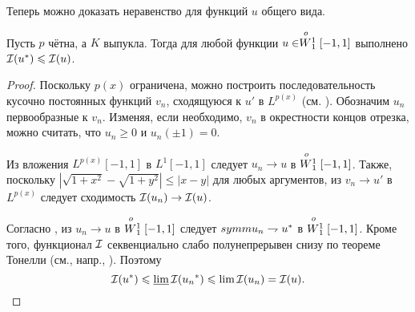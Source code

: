 Теперь можно доказать неравенство для функций $u$ общего вида.

\begin{thm}
\label{variable_exponent_thm}
Пусть $p$ чётна, а $K$ выпукла.
Тогда для любой функции $u \in \stackrel{o\ }{W{}_1^1}[-1, 1]$ выполнено $\mathcal{I}({{u}^*}) \leqslant \mathcal{I}(u)$.
\end{thm}

\begin{proof}
Поскольку $p(x)$ ограничена, можно построить последовательность кусочно постоянных функций $v_n$, сходящуюся к $u'$ в $L^{p(x)}$
(см. \cite[Теорема~1.4.1]{Sharapudinov}).
Обозначим $u_n$ первообразные к $v_n$.
Изменяя, если необходимо, $v_n$ в окрестности концов отрезка, можно считать, что $u_n \ge 0$ и $u_n(\pm 1) = 0$.

Из вложения $L^{p(x)}[-1, 1]$ в $L^1[-1, 1]$ следует $u_n \to u$ в $\stackrel{o\ }{W{}_1^1}[-1, 1]$.
Также, поскольку $| \sqrt{ 1 + x^2 } - \sqrt{ 1 + y^2 } | \le | x - y |$ для любых аргументов,
из $v_n \to u'$ в $L^{p(x)}$ следует сходимость $\mathcal{I}( u_n ) \to \mathcal{I}( u )$.

%

Согласно \cite[теорема 1]{Brock}, из $u_n \to u$ в $\stackrel{o\ }{W{}_1^1}[-1, 1]$ следует $symm{u_n} \rightharpoondown {{u}^*}$ в $\stackrel{o\ }{W{}_1^1}[-1, 1]$.
Кроме того, функционал $\mathcal{I}$ секвенциально слабо полунепрерывен снизу по теореме Тонелли (см., напр., \cite[Теорема 3.5]{BGH}).
Поэтому
$$
\mathcal{I}({{u}^*}) \leqslant \varliminf \mathcal{I}({{u_n}^*}) \leqslant \lim \mathcal{I}(u_n) = \mathcal{I}(u).
$$
\end{proof}

